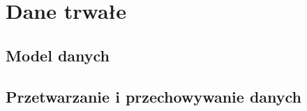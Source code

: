 \newpage
\section{Dane trwałe}
\subsection{Model danych}
\subsection{Przetwarzanie i przechowywanie danych}